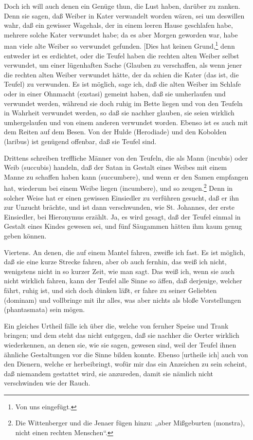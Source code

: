 Doch ich will auch denen ein Genüge thun, die Lust haben, darüber zu zanken. Denn sie sagen, daß Weiber in Kater verwandelt worden wären, sei um deswillen wahr, daß ein gewisser Wagehals, der in einem leeren Hause geschlafen habe, mehrere solche Kater verwundet habe; da es aber Morgen geworden war, habe man viele alte Weiber so verwundet gefunden. [Dies hat
keinen Grund,\footnote{Von uns eingefügt.} denn entweder ist es erdichtet, oder die Teufel haben die rechten alten Weiber selbst verwundet, um einer lügenhaften Sache (Glauben zu verschaffen, als wenn jener die rechten alten Weiber verwundet hätte, der da schien die Kater (das ist, die Teufel) zu verwunden. Es ist möglich, sage ich, daß die alten Weiber im Schlafe oder in einer Ohnmacht (exstasi) gemeint haben, daß sie umherlaufen und verwundet werden, während sie doch ruhig im Bette liegen und von den Teufeln in Wahrheit verwundet werden, so daß sie nachher glauben, sie seien wirklich umhergelaufen und von einem anderen verwundet worden. Ebenso ist es auch mit dem Reiten auf dem Besen. Von der Hulde (Herodiade) und den Kobolden (laribus) ist genügend offenbar, daß sie Teufel sind.

Drittens schreiben treffliche Männer von den Teufeln, die als Mann (incubis) oder Weib (succubis) handeln, daß der Satan in Gestalt eines Weibes mit einem Manne zu schaffen haben kann (succumbere), und wenn er den Samen empfangen hat, wiederum bei einem Weibe liegen (incumbere), und so zeugen.\footnote{Die Wittenberger und die Jenaer fügen hinzu: „aber Mißgeburten (monstra), nicht einen rechten Menschen“.} Denn in solcher Weise hat er einen gewissen Einsiedler zu verführen gesucht, daß er ihn zur Unzucht brächte, und ist dann verschwunden, wie St. Johannes, der erste Einsiedler, bei Hieronymus erzählt. Ja, es wird gesagt, daß der Teufel einmal in Gestalt eines Kindes gewesen sei, und fünf Säugammen hätten ihm kaum genug geben können.

Viertens. An denen, die auf einem Mantel fahren, zweifle ich fast. Es ist möglich, daß sie eine kurze Strecke fahren, aber ob auch fernhin, das weiß ich nicht, wenigstens nicht in so kurzer Zeit, wie man sagt. Das weiß ich, wenn sie auch nicht wirklich fahren, kann der Teufel alle Sinne so äffen, daß derjenige, welcher fährt, ruhig ist, und sich doch dünken läßt, er fahre zu seiner Geliebten (dominam) und vollbringe mit ihr alles, was aber nichts als bloße Vorstellungen (phantasmata) sein mögen.

Ein gleiches Urtheil fälle ich über die, welche von fernher Speise und Trank bringen; und dem steht das nicht entgegen, daß sie nachher die Oerter wirklich wiederkennen, an denen sie, wie sie sagen, gewesen sind, weil der Teufel ihnen ähnliche Gestaltungen vor die Sinne bilden konnte. Ebenso [urtheile ich] auch von den Dienern, welche er herbeibringt, wofür mir das ein Anzeichen zu sein scheint, daß niemandem gestattet wird, sie anzureden, damit sie nämlich nicht verschwinden wie der Rauch.

